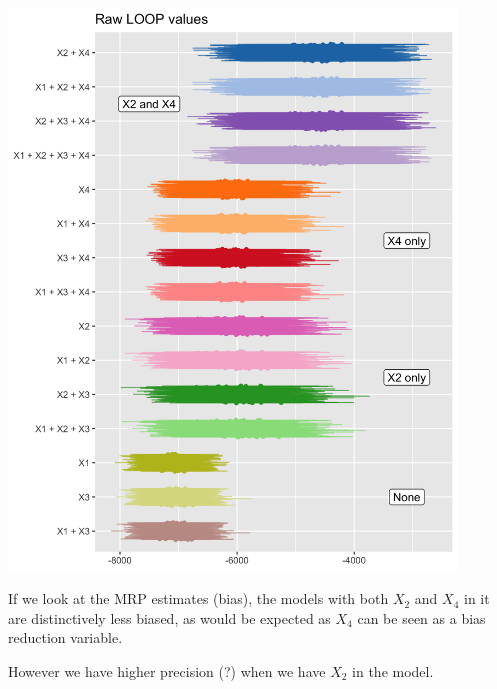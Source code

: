 \documentclass[
]{article}
\begin{document}
\includegraphics[width=4.6875in,height=\textheight]{images/3b/plot_loop.png}

If we look at the MRP estimates (bias), the models with both \(X_2\) and
\(X_4\) in it are distinctively less biased, as would be expected as
\(X_4\) can be seen as a bias reduction variable.

However we have higher precision (?) when we have \(X_2\) in the model.
\end{document}

